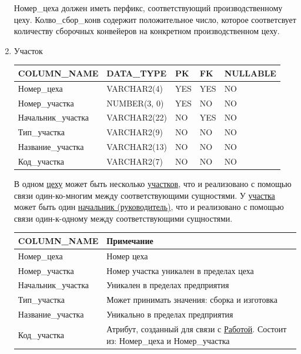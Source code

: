 \begin{enumerate}
\begin{tabular}{|p{7cm}|p{3cm}|p{1cm}|p{1cm}|p{3cm}|}
    \end{tabular}

    Номер\_цеха должен иметь перфикс, соответствующий производственному цеху.
    Колво\_сбор\_конв содержит положительное число, которое соответсвует количеству сборочных конвейеров на конкретном производственном цеху.

    \item{Участок}

    \begin{tabular}{|p{7cm}|p{3cm}|p{1cm}|p{1cm}|p{3cm}|} \hline

        {\bf COLUMN\_NAME} & {\bf DATA\_TYPE} & {\bf PK} & {\bf FK} & {\bf NULLABLE} \\ \hline
        Номер\_цеха & VARCHAR2(4) & YES & YES & NO \\ \hline
        Номер\_участка & NUMBER(3, 0) & YES & NO & NO \\ \hline
        Начальник\_участка & VARCHAR2(22) & NO & YES & NO \\ \hline
        Тип\_участка & VARCHAR2(9) & NO & NO & NO \\ \hline
        Название\_участка & VARCHAR2(13) & NO & NO & NO \\ \hline
        Код\_участка & VARCHAR2(7) & NO & NO & NO \\ \hline

    \end{tabular}

    В одном \underline{цеху} может быть несколько \underline{участков}, что и реализовано с помощью связи один-ко-многим между соответствующими сущностями.
    У \underline{участка} может быть один \underline{начальник (руководитель)}, что и реализовано с помощью связи один-к-одному между соответствующими сущностями.

    \begin{tabular}{|p{7cm}|p{9.3cm}|} \hline

        {\bf COLUMN\_NAME} & {\bf Примечание} \\ \hline
        Номер\_цеха & Номер цеха \\ \hline
        Номер\_участка & Номер участка уникален в пределах цеха \\ \hline
        Начальник\_участка & Уникален в пределах предприятия \\ \hline
        Тип\_участка & Может принимать значения: сборка и изготовка \\ \hline
        Название\_участка & Уникально в пределах предприятия \\ \hline
        Код\_участка & Атрибут, созданный для связи с \underline{Работой}. Состоит из: Номер\_цеха и Номер\_участка \\ \hline


\end{tabular}
\end{enumerate}
